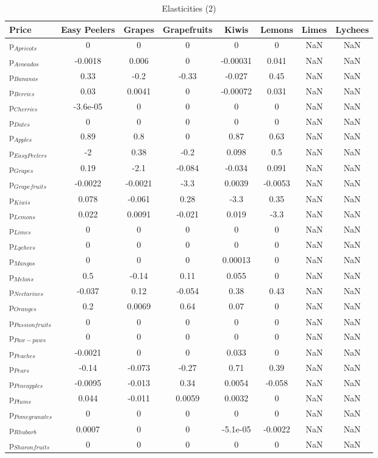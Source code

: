 \documentclass[11pt]{article}
\begin{document}
\begin{table}[h]
\caption{Elasticities (2)}
\label{Table: elasticities 2}
\begin{center}
\begin{tabular}{lccccccc} \hline \hline
Price &Easy Peelers &Grapes &Grapefruits &Kiwis &Lemons &Limes &Lychees \\ \hline
p$_{Apricots}$ &0 &0 &0 &0 &0 &NaN &NaN \\
p$_{Avocados}$ &-0.0018 &0.006 &0 &-0.00031 &0.041 &NaN &NaN \\
p$_{Bananas}$ &0.33 &-0.2 &-0.33 &-0.027 &0.45 &NaN &NaN \\
p$_{Berries}$ &0.03 &0.0041 &0 &-0.00072 &0.031 &NaN &NaN \\
p$_{Cherries}$ &-3.6e-05 &0 &0 &0 &0 &NaN &NaN \\
p$_{Dates}$ &0 &0 &0 &0 &0 &NaN &NaN \\
p$_{Apples}$ &0.89 &0.8 &0 &0.87 &0.63 &NaN &NaN \\
p$_{Easy Peelers}$ &-2 &0.38 &-0.2 &0.098 &0.5 &NaN &NaN \\
p$_{Grapes}$ &0.19 &-2.1 &-0.084 &-0.034 &0.091 &NaN &NaN \\
p$_{Grapefruits}$ &-0.0022 &-0.0021 &-3.3 &0.0039 &-0.0053 &NaN &NaN \\
p$_{Kiwis}$ &0.078 &-0.061 &0.28 &-3.3 &0.35 &NaN &NaN \\
p$_{Lemons}$ &0.022 &0.0091 &-0.021 &0.019 &-3.3 &NaN &NaN \\
p$_{Limes}$ &0 &0 &0 &0 &0 &NaN &NaN \\
p$_{Lychees}$ &0 &0 &0 &0 &0 &NaN &NaN \\
p$_{Mangos}$ &0 &0 &0 &0.00013 &0 &NaN &NaN \\
p$_{Melons}$ &0.5 &-0.14 &0.11 &0.055 &0 &NaN &NaN \\
p$_{Nectarines}$ &-0.037 &0.12 &-0.054 &0.38 &0.43 &NaN &NaN \\
p$_{Oranges}$ &0.2 &0.0069 &0.64 &0.07 &0 &NaN &NaN \\
p$_{Passion fruits}$ &0 &0 &0 &0 &0 &NaN &NaN \\
p$_{Paw-paws}$ &0 &0 &0 &0 &0 &NaN &NaN \\
p$_{Peaches}$ &-0.0021 &0 &0 &0.033 &0 &NaN &NaN \\
p$_{Pears}$ &-0.14 &-0.073 &-0.27 &0.71 &0.39 &NaN &NaN \\
p$_{Pineapples}$ &-0.0095 &-0.013 &0.34 &0.0054 &-0.058 &NaN &NaN \\
p$_{Plums}$ &0.044 &-0.011 &0.0059 &0.0032 &0 &NaN &NaN \\
p$_{Pomegranates}$ &0 &0 &0 &0 &0 &NaN &NaN \\
p$_{Rhubarb}$ &0.0007 &0 &0 &-5.1e-05 &-0.0022 &NaN &NaN \\
p$_{Sharon fruits}$ &0 &0 &0 &0 &0 &NaN &NaN \\
\end{tabular}
\end{center}
\end{table}
\end{document}
